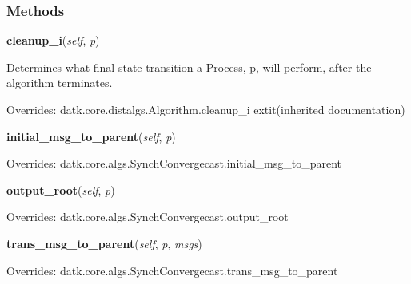   \subsubsection{Methods}

    \vspace{0.5ex}

\hspace{.8\funcindent}\begin{boxedminipage}{\funcwidth}

    \raggedright \textbf{cleanup\_i}(\textit{self}, \textit{p})

\setlength{\parskip}{2ex}
    Determines what final state transition a Process, p, will perform, 
    after the algorithm terminates.

\setlength{\parskip}{1ex}
      Overrides: datk.core.distalgs.Algorithm.cleanup\_i 	extit{(inherited documentation)}

    \end{boxedminipage}

    \vspace{0.5ex}

\hspace{.8\funcindent}\begin{boxedminipage}{\funcwidth}

    \raggedright \textbf{initial\_msg\_to\_parent}(\textit{self}, \textit{p})

\setlength{\parskip}{2ex}
\setlength{\parskip}{1ex}
      Overrides: datk.core.algs.SynchConvergecast.initial\_msg\_to\_parent

    \end{boxedminipage}

    \vspace{0.5ex}

\hspace{.8\funcindent}\begin{boxedminipage}{\funcwidth}

    \raggedright \textbf{output\_root}(\textit{self}, \textit{p})

\setlength{\parskip}{2ex}
\setlength{\parskip}{1ex}
      Overrides: datk.core.algs.SynchConvergecast.output\_root

    \end{boxedminipage}

    \vspace{0.5ex}

\hspace{.8\funcindent}\begin{boxedminipage}{\funcwidth}

    \raggedright \textbf{trans\_msg\_to\_parent}(\textit{self}, \textit{p}, \textit{msgs})

\setlength{\parskip}{2ex}
\setlength{\parskip}{1ex}
      Overrides: datk.core.algs.SynchConvergecast.trans\_msg\_to\_parent

    \end{boxedminipage}

